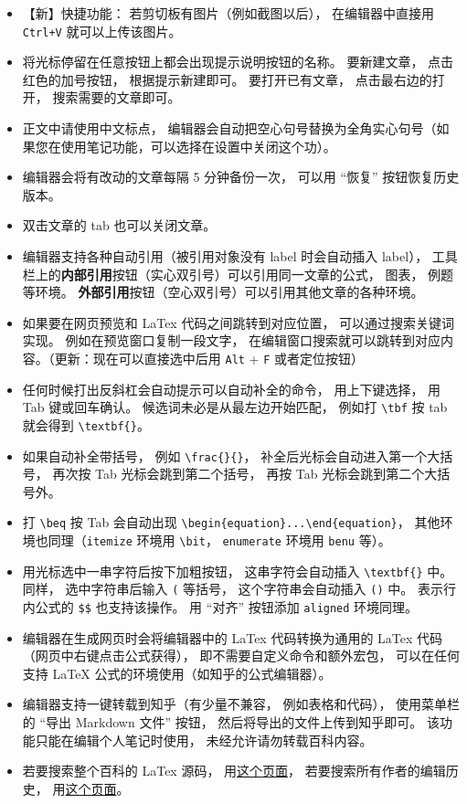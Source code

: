 \begin{itemize}
\item 【新】快捷功能： 若剪切板有图片（例如截图以后）， 在编辑器中直接用 \verb|Ctrl+V| 就可以上传该图片。
\item 将光标停留在任意按钮上都会出现提示说明按钮的名称。 要新建文章， 点击红色的加号按钮， 根据提示新建即可。 要打开已有文章， 点击最右边的打开， 搜索需要的文章即可。
\item 正文中请使用中文标点， 编辑器会自动把空心句号替换为全角实心句号（如果您在使用笔记功能，可以选择在设置中关闭这个功）。
\item 编辑器会将有改动的文章每隔 5 分钟备份一次， 可以用 “恢复” 按钮恢复历史版本。
\item 双击文章的 tab 也可以关闭文章。
\item 编辑器支持各种自动引用（被引用对象没有 label 时会自动插入 label）， 工具栏上的\textbf{内部引用}按钮（实心双引号）可以引用同一文章的公式， 图表， 例题等环境。 \textbf{外部引用}按钮（空心双引号）可以引用其他文章的各种环境。
\item 如果要在网页预览和 LaTex 代码之间跳转到对应位置， 可以通过搜索关键词实现。 例如在预览窗口复制一段文字， 在编辑窗口搜索就可以跳转到对应内容。（更新：现在可以直接选中后用 \verb`Alt` + \verb`F` 或者定位按钮）
\item 任何时候打出反斜杠会自动提示可以自动补全的命令， 用上下键选择， 用 Tab 键或回车确认。 候选词未必是从最左边开始匹配， 例如打 \verb|\tbf| 按 tab 就会得到 \verb|\textbf{}|。
\item 如果自动补全带括号， 例如 \verb|\frac{}{}|， 补全后光标会自动进入第一个大括号， 再次按 Tab 光标会跳到第二个括号， 再按 Tab 光标会跳到第二个大括号外。
\item 打 \verb|\beq| 按 Tab 会自动出现 \verb|\begin{equation}...\end{equation}|， 其他环境也同理（\verb`itemize` 环境用 \verb`\bit`， \verb`enumerate` 环境用 \verb`benu` 等）。
\item 用光标选中一串字符后按下加粗按钮， 这串字符会自动插入 \verb|\textbf{}| 中。 同样， 选中字符串后输入 \verb|(| 等括号， 这个字符串会自动插入 \verb|()| 中。 表示行内公式的 \verb|$$| 也支持该操作。 用 “对齐” 按钮添加 \verb|aligned| 环境同理。
\item 编辑器在生成网页时会将编辑器中的 LaTex 代码转换为通用的 LaTex 代码（网页中右键点击公式获得）， 即不需要自定义命令和额外宏包， 可以在任何支持 LaTeX 公式的环境使用（如知乎的公式编辑器）。
\item 编辑器支持一键转载到知乎（有少量不兼容， 例如表格和代码）， 使用菜单栏的 “导出 Markdown 文件” 按钮， 然后将导出的文件上传到知乎即可。 该功能只能在编辑个人笔记时使用， 未经允许请勿转载百科内容。
\item 若要搜索整个百科的 LaTex 源码， 用\href{https://github.com/MacroUniverse/PhysWiki-log/tree/master/contents}{这个页面}， 若要搜索所有作者的编辑历史， 用\href{https://github.com/MacroUniverse/PhysWiki-backup}{这个页面}。
\end{itemize}

